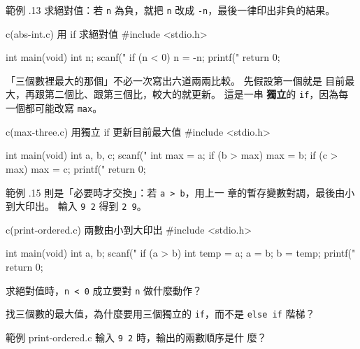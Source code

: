
範例 \thechapter.13 求絕對值：若 \texttt{n} 為負，就把 \texttt{n} 改成
\texttt{-n}，最後一律印出非負的結果。

\begin{example}{c}{(abs-int.c) 用 if 求絕對值}
#include <stdio.h>

int main(void) {
    int n;
    scanf("%
    if (n < 0) {
        n = -n;
    }
    printf("%
    return 0;
}
\end{example}


「三個數裡最大的那個」不必一次寫出六道兩兩比較。 先假設第一個就是
目前最大，再跟第二個比、跟第三個比，較大的就更新。 這是一串\textbf{
獨立}的 \texttt{if}，因為每一個都可能改寫 \texttt{max}。

\begin{example}{c}{(max-three.c) 用獨立 if 更新目前最大值}
#include <stdio.h>

int main(void) {
    int a, b, c;
    scanf("%
    int max = a;
    if (b > max) {
        max = b;
    }
    if (c > max) {
        max = c;
    }
    printf("%
    return 0;
}
\end{example}


範例 \thechapter.15 則是「必要時才交換」：若 \texttt{a > b}，用上一
章的暫存變數對調，最後由小到大印出。 輸入 \texttt{9 2} 得到
\texttt{2 9}。

\begin{example}{c}{(print-ordered.c) 兩數由小到大印出}
#include <stdio.h>

int main(void) {
    int a, b;
    scanf("%
    if (a > b) {
        int temp = a;
        a = b;
        b = temp;
    }
    printf("%
    return 0;
}
\end{example}


\begin{drills}[label=drills:cond-rewrite-values]
\item 求絕對值時，\texttt{n < 0} 成立要對 \texttt{n} 做什麼動作？
\item 找三個數的最大值，為什麼要用三個獨立的 \texttt{if}，而不是
\texttt{else if} 階梯？
\item 範例 print-ordered.c 輸入 \texttt{9 2} 時，輸出的兩數順序是什
麼？
\end{drills}

